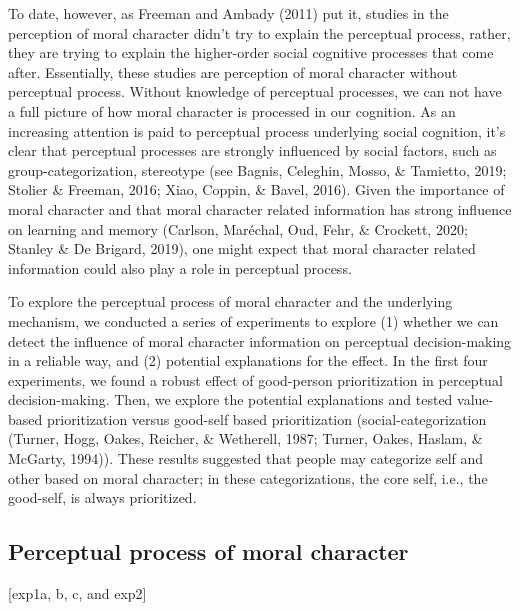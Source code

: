 \documentclass[
  english,
  man]{apa6}
\begin{document}
To date, however, as Freeman and Ambady (2011) put it, studies in the perception of moral character didn't try to explain the perceptual process, rather, they are trying to explain the higher-order social cognitive processes that come after. Essentially, these studies are perception of moral character without perceptual process. Without knowledge of perceptual processes, we can not have a full picture of how moral character is processed in our cognition. As an increasing attention is paid to perceptual process underlying social cognition, it's clear that perceptual processes are strongly influenced by social factors, such as group-categorization, stereotype (see Bagnis, Celeghin, Mosso, \& Tamietto, 2019; Stolier \& Freeman, 2016; Xiao, Coppin, \& Bavel, 2016). Given the importance of moral character and that moral character related information has strong influence on learning and memory (Carlson, Maréchal, Oud, Fehr, \& Crockett, 2020; Stanley \& De Brigard, 2019), one might expect that moral character related information could also play a role in perceptual process.

To explore the perceptual process of moral character and the underlying mechanism, we conducted a series of experiments to explore (1) whether we can detect the influence of moral character information on perceptual decision-making in a reliable way, and (2) potential explanations for the effect. In the first four experiments, we found a robust effect of good-person prioritization in perceptual decision-making. Then, we explore the potential explanations and tested value-based prioritization versus good-self based prioritization (social-categorization (Turner, Hogg, Oakes, Reicher, \& Wetherell, 1987; Turner, Oakes, Haslam, \& McGarty, 1994)). These results suggested that people may categorize self and other based on moral character; in these categorizations, the core self, i.e., the good-self, is always prioritized.

\hypertarget{perceptual-process-of-moral-character}{%
\subsection{Perceptual process of moral character}\label{perceptual-process-of-moral-character}}

{[}exp1a, b, c, and exp2{]}
\end{document}

